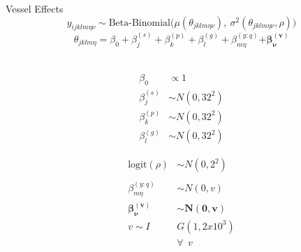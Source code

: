 \documentclass[ xcolor = pdftex, dvipsnames, table ]{beamer}
\begin{document}
%
\begin{frame}{Vessel Effects}
\vspace*{-0.5cm}
\begin{equation*}
        y_{ijklm\eta\nu} \sim \text{Beta-Binomial}\Big(\mu( \theta_{jklm\eta\nu}),~\sigma^2( \theta_{jklm\eta\nu}, \rho) \Big)
\end{equation*}
\begin{equation*}
        \theta_{jklm\eta} = \beta_0 + \beta^{(s)}_j + \beta^{(p)}_k + \beta^{(g)}_l + \beta^{(y:q)}_{m\eta} \bm{+ \beta^{(v)}_\nu} 
\end{equation*}
$~$\\
\vspace*{-0.25cm}
\hspace*{-0.5cm}
\begin{minipage}[h!]{0.3\textwidth}
	\begin{align*}
	\beta_0 &\propto 1\\
	\beta^{(s)}_j &\sim N(0, 32^2)\\
	\beta^{(p)}_k &\sim N(0, 32^2)\\
	\beta^{(g)}_l &\sim N(0, 32^2)
	\end{align*}
\end{minipage}
\begin{minipage}[h!]{0.39\textwidth}
	\begin{align*}
        \text{logit}(\rho) &\sim N(0, 2^2)\\
	&\\
	\beta^{(y:q)}_{m\eta} &\sim N(0,v)\\
	\bm{\beta^{(v)}_\nu} &\bm{\sim N(0,v)}\\ 
        v\sim I&G(1,2x10^{3})\\
	&\forall ~~ v 
        \end{align*}

\end{minipage}
\end{frame}
\end{document}
